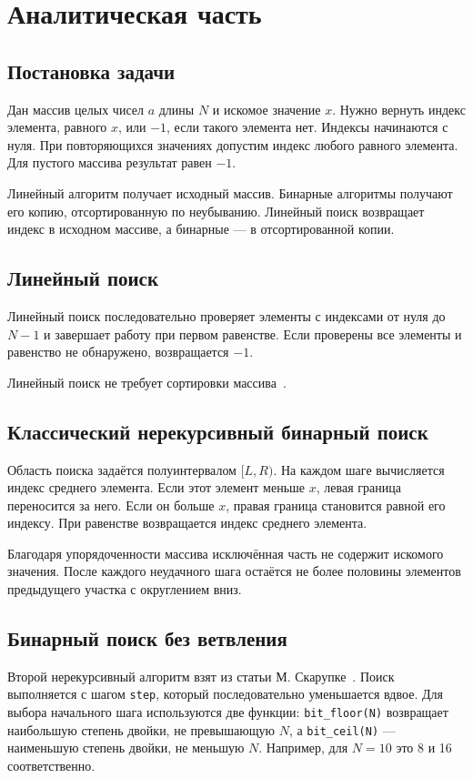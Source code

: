 \chapter{Аналитическая часть}
\section{Постановка задачи}
Дан массив целых чисел $a$ длины $N$ и искомое значение $x$. Нужно вернуть индекс элемента, равного $x$, или $-1$, если такого элемента нет. Индексы начинаются с нуля. При повторяющихся значениях допустим индекс любого равного элемента. Для пустого массива результат равен $-1$.

Линейный алгоритм получает исходный массив. Бинарные алгоритмы получают его копию, отсортированную по неубыванию. Линейный поиск возвращает индекс в исходном массиве, а бинарные --- в отсортированной копии.

\section{Линейный поиск}
Линейный поиск последовательно проверяет элементы с индексами от нуля до $N-1$ и завершает работу при первом равенстве. Если проверены все элементы и равенство не обнаружено, возвращается $-1$.

Линейный поиск не требует сортировки массива~\cite{cormen}.

\section{Классический нерекурсивный бинарный поиск}
Область поиска задаётся полуинтервалом $[L,R)$. На каждом шаге вычисляется индекс среднего элемента. Если этот элемент меньше $x$, левая граница переносится за него. Если он больше $x$, правая граница становится равной его индексу. При равенстве возвращается индекс среднего элемента.

Благодаря упорядоченности массива исключённая часть не содержит искомого значения. После каждого неудачного шага остаётся не более половины элементов предыдущего участка с округлением вниз.

\section{Бинарный поиск без ветвления}
Второй нерекурсивный алгоритм взят из статьи М. Скарупке~\cite{skarupke}. Поиск выполняется с шагом \texttt{step}, который последовательно уменьшается вдвое. Для выбора начального шага используются две функции: \texttt{bit\_floor(N)} возвращает наибольшую степень двойки, не превышающую $N$, а \texttt{bit\_ceil(N)} --- наименьшую степень двойки, не меньшую $N$. Например, для $N=10$ это 8 и 16 соответственно.

